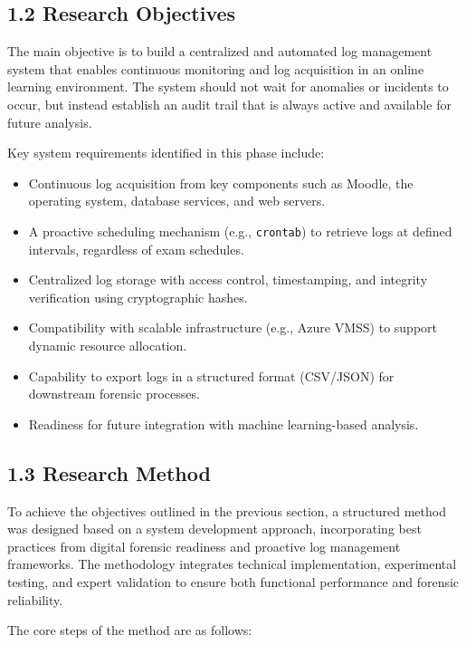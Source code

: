 \subsection{1.2 Research Objectives}
The main objective is to build a centralized and automated log management system that enables continuous monitoring and log acquisition in an online learning environment. The system should not wait for anomalies or incidents to occur, but instead establish an audit trail that is always active and available for future analysis.

Key system requirements identified in this phase include:

\begin{itemize}
	\item Continuous log acquisition from key components such as Moodle, the operating system, database services, and web servers.
	\item A proactive scheduling mechanism (e.g., \texttt{crontab}) to retrieve logs at defined intervals, regardless of exam schedules.
	\item Centralized log storage with access control, timestamping, and integrity verification using cryptographic hashes.
	\item Compatibility with scalable infrastructure (e.g., Azure VMSS) to support dynamic resource allocation.
	\item Capability to export logs in a structured format (CSV/JSON) for downstream forensic processes.
	\item Readiness for future integration with machine learning-based analysis.
\end{itemize}


\subsection{1.3 Research Method}
To achieve the objectives outlined in the previous section, a structured method was designed based on a system development approach, incorporating best practices from digital forensic readiness and proactive log management frameworks. The methodology integrates technical implementation, experimental testing, and expert validation to ensure both functional performance and forensic reliability.

The core steps of the method are as follows:

